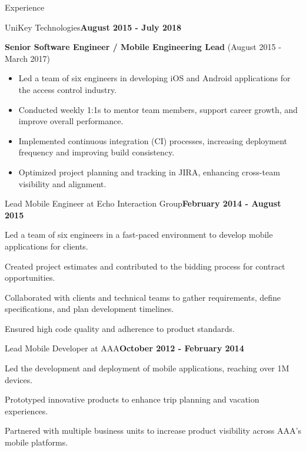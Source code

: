 \documentclass{resume} %
\begin{document}
\begin{rSection}{Experience}
\begin{rSubsection}{UniKey Technologies}{\bf August 2015 - July 2018}{}{}
        \item {\bf Senior Software Engineer / Mobile Engineering Lead} (August 2015 - March 2017)  
        \begin{itemize}
            \item Led a team of six engineers in developing iOS and Android applications for the access control industry.  
            \item Conducted weekly 1:1s to mentor team members, support career growth, and improve overall performance.  
            \item Implemented continuous integration (CI) processes, increasing deployment frequency and improving build consistency. 
            \item Optimized project planning and tracking in JIRA, enhancing cross-team visibility and alignment.  
        \end{itemize}
    
    
        \end{rSubsection}
    
    


    \begin{rSubsection}{Lead Mobile Engineer at Echo Interaction Group}{\bf February 2014 - August 2015}{}{}

    \item Led a team of six engineers in a fast-paced environment to develop mobile applications for clients.  
    \item Created project estimates and contributed to the bidding process for contract opportunities.  
    \item Collaborated with clients and technical teams to gather requirements, define specifications, and plan development timelines.  
    \item Ensured high code quality and adherence to product standards.  


    \end{rSubsection}


    \begin{rSubsection}{Lead Mobile Developer at AAA}{\bf October 2012 - February 2014}{}{}

    \item Led the development and deployment of mobile applications, reaching over 1M devices.  
    \item Prototyped innovative products to enhance trip planning and vacation experiences.  
    \item Partnered with multiple business units to increase product visibility across AAA’s mobile platforms.  

    \end{rSubsection}


\end{rSection}
\end{document}
